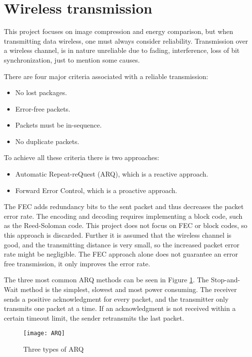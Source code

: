 \section{Wireless transmission}
This project focuses on image compression and energy comparison, but when transmitting data wireless, one must always consider reliability.
Transmission over a wireless channel, is in nature unreliable due to fading, interference, loss of bit synchronization, just to mention some causes.

There are four major criteria associated with a reliable transmission:
\begin{itemize}
\item No lost packages.
\item Error-free packets.
\item Packets must be in-sequence.
\item No duplicate packets.
\end{itemize}
To achieve all these criteria there is two approaches:
\begin{itemize}
\item Automatic Repeat-reQuest (ARQ), which is a reactive approach.
\item Forward Error Control, which is a proactive approach. 
\end{itemize}

The FEC adds redundancy bits to the sent packet and thus decreases the packet error rate.
The encoding and decoding requires implementing a block code, such as the Reed-Soloman code.
This project does not focus on FEC or block codes, so this approach is discarded.
Further it is assumed that the wireless channel is good, and the transmitting distance is very small, so the increased packet error rate might be negligible.
The FEC approach alone does not guarantee an error free transmission, it only improves the error rate.

The three most common ARQ methods can be seen in Figure \ref{fig:ARQ}. The Stop-and-Wait method is the simplest, slowest and most power consuming. The receiver sends a positive acknowledgment for every packet, and the transmitter only transmits one packet at a time. If an acknowledgment is not received within a certain timeout limit, the sender retransmits the last packet.

\begin{figure}
\centering
\texttt{[image: ARQ]}
\caption{Three types of ARQ}
\label{fig:ARQ}
\end{figure}

